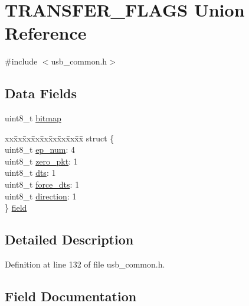 \hypertarget{union_t_r_a_n_s_f_e_r___f_l_a_g_s}{}\section{T\+R\+A\+N\+S\+F\+E\+R\+\_\+\+F\+L\+A\+GS Union Reference}
\label{union_t_r_a_n_s_f_e_r___f_l_a_g_s}


{\ttfamily \#include $<$usb\+\_\+common.\+h$>$}

\subsection*{Data Fields}
\begin{DoxyCompactItemize}
\item 
uint8\+\_\+t \mbox{\hyperlink{union_t_r_a_n_s_f_e_r___f_l_a_g_s_af37eb37e6f2ba058599923f1fdb75360}{bitmap}}
\item 
\begin{tabbing}
xx\=xx\=xx\=xx\=xx\=xx\=xx\=xx\=xx\=\kill
struct \{\\
\>uint8\_t \mbox{\hyperlink{union_t_r_a_n_s_f_e_r___f_l_a_g_s_a0eb60627df64d4e20dc3a36f3c1af073}{ep\_num}}: 4\\
\>uint8\_t \mbox{\hyperlink{union_t_r_a_n_s_f_e_r___f_l_a_g_s_a3dbf03d72e11e17778bca583ab0381cf}{zero\_pkt}}: 1\\
\>uint8\_t \mbox{\hyperlink{union_t_r_a_n_s_f_e_r___f_l_a_g_s_ad0a003bce451292d1163a4d6fe533574}{dts}}: 1\\
\>uint8\_t \mbox{\hyperlink{union_t_r_a_n_s_f_e_r___f_l_a_g_s_a905113be5625941ed80e4710f60fe7ef}{force\_dts}}: 1\\
\>uint8\_t \mbox{\hyperlink{union_t_r_a_n_s_f_e_r___f_l_a_g_s_ac6116d5235e13e059e591879c46d7174}{direction}}: 1\\
\} \mbox{\hyperlink{union_t_r_a_n_s_f_e_r___f_l_a_g_s_a4c884c664f6602e7421d5a48faea541e}{field}}\\

\end{tabbing}\end{DoxyCompactItemize}


\subsection{Detailed Description}


Definition at line 132 of file usb\+\_\+common.\+h.



\subsection{Field Documentation}
\mbox{\label{union_t_r_a_n_s_f_e_r___f_l_a_g_s_af37eb37e6f2ba058599923f1fdb75360}} 
